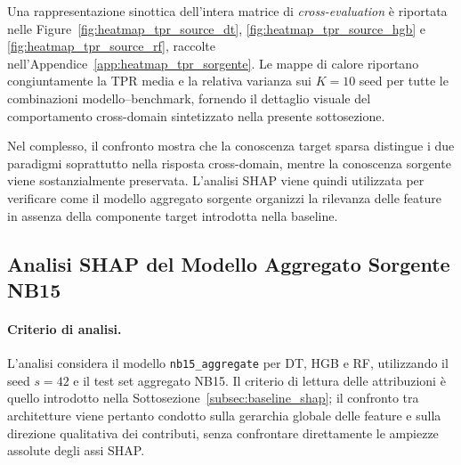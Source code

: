 Una rappresentazione sinottica dell'intera matrice di \textit{cross-evaluation} è riportata nelle Figure~\ref{fig:heatmap_tpr_source_dt}, \ref{fig:heatmap_tpr_source_hgb} e \ref{fig:heatmap_tpr_source_rf}, raccolte nell'Appendice~\ref{app:heatmap_tpr_sorgente}.
Le mappe di calore riportano congiuntamente la TPR media e la relativa varianza sui $K=10$ seed per tutte le combinazioni modello--benchmark, fornendo il dettaglio visuale del comportamento cross-domain sintetizzato nella presente sottosezione.

Nel complesso, il confronto mostra che la conoscenza target sparsa distingue i due paradigmi soprattutto nella risposta cross-domain, mentre la conoscenza sorgente viene sostanzialmente preservata. 
L'analisi SHAP viene quindi utilizzata per verificare come il modello aggregato sorgente organizzi la rilevanza delle feature in assenza della componente target introdotta nella baseline.



\subsection{Analisi SHAP del Modello Aggregato Sorgente NB15}
\label{subsec:sorgente_shap}

\paragraph{Criterio di analisi.}
L'analisi considera il modello \texttt{nb15\_aggregate} per DT, HGB e RF, utilizzando il seed $s=42$ e il test set aggregato NB15. 
Il criterio di lettura delle attribuzioni è quello introdotto nella Sottosezione~\ref{subsec:baseline_shap}; il confronto tra architetture viene pertanto condotto sulla gerarchia globale delle feature e sulla direzione qualitativa dei contributi, senza confrontare direttamente le ampiezze assolute degli assi SHAP.

